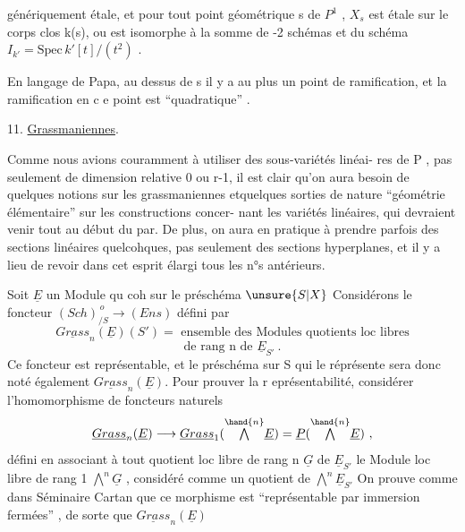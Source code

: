 
génériquement étale, et pour tout point géométrique  s de $P^1$ ,  $X_s$
est étale sur le corps \hand{$-$} clos  k(s), ou   est
isomorphe à la somme de -2  schémas    et   du schéma  
$I_{k'} = \mathrm{Spec}\, k'[t]/(t^2)$ .

En langage de Papa, au  dessus de s  il y a au plus un point de
ramification, et la ramification en c e point est ``quadratique'' .

11.  \uline{Grassmaniennes}. 

Comme nous avions couramment à utiliser des sous-variétés linéai-%
res de P , pas seulement de dimension relative 0 ou r-1, il est clair
qu'on aura besoin de quelques notions sur les grassmaniennes  etquelques
sorties de nature ``géométrie élémentaire'' sur les constructions concer-%
nant les variétés linéaires, qui  devraient venir tout au début du par.
De plus, on aura en pratique à prendre parfois des sections linéaires
quelcohques, pas seulement des sections hyperplanes, et il y a lieu de
revoir dans cet esprit élargi tous les n°s antérieurs.

Soit  $\underline{E}$  un Module qu coh  sur le préschéma $\unsure{S|X}$\hand{,} Considérons le
foncteur \qquad $(Sch)_{/S}^{\,o} \longrightarrow (Ens)$  défini par
\[ \underline{Grass}_n(\underline{E})(S') = \text{ ensemble des Modules quotients loc libres} \]
\[ \text{de rang  n  de } \underline{E}_{S'} \ . \]
Ce foncteur est représentable, et le préschéma sur S qui le réprésente
sera donc noté également $\underline{Grass}_n(\underline{E})$.  Pour prouver la r eprésentabilité,
considérer l'homomorphisme de foncteurs naturels
\[ \underline{Grass}_n(\underline{E}) \longrightarrow \underline{Grass}_1( \overset{\hand{n}}{\textstyle\bigwedge} \underline{E} ) = \underline{P} ( \overset{\hand{n}}{\textstyle\bigwedge} \underline{E}) \ , \]
défini en associant à  tout  quotient loc libre  de rang n  $\underline{G}$  de $\underline{E}_{S'}$
le Module  loc libre de rang 1 \quad $\overset{n}{\textstyle\bigwedge} \underline{G}$ , considéré comme un quotient
de  $\overset{n}{\textstyle\bigwedge} \underline{E}_{S'}$   On prouve comme dans  Séminaire Cartan que  ce morphisme
est  ``représentable par  immersion fermées'' , de sorte que $\underline{Grass}_n(\underline{E})$

